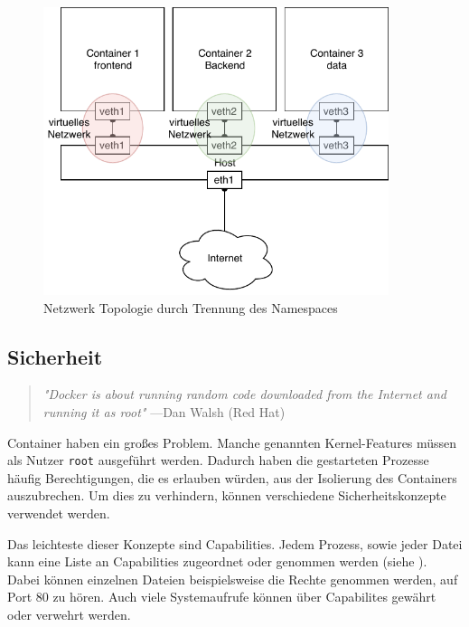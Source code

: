 \begin{figure}[h]
	\begin{center}
		\includegraphics[width=0.9\textwidth]{bilder/network-topology.pdf}
		\caption{Netzwerk Topologie durch Trennung des Namespaces}
		\label{fig:containerHostNetwork}
	\end{center}
\end{figure} 


\subsection{Sicherheit}
\label{sec:sicherheit}

\begin{quote}
	\textit{"Docker is about running random code downloaded from the Internet and running it as root"}
	\flushright
	\small{---Dan Walsh (Red Hat)}
\end{quote}

Container haben ein großes Problem. Manche genannten Kernel-Features müssen als Nutzer \texttt{root} ausgeführt werden. Dadurch haben die gestarteten Prozesse häufig Berechtigungen, die es erlauben würden, aus der Isolierung des Containers auszubrechen. Um dies zu verhindern, können verschiedene Sicherheitskonzepte verwendet werden.

Das leichteste dieser Konzepte sind Capabilities. Jedem Prozess, sowie jeder Datei kann eine Liste an Capabilities zugeordnet oder genommen werden (siehe ). Dabei können einzelnen Dateien beispielsweise die Rechte genommen werden, auf Port 80 zu hören. Auch viele Systemaufrufe können über Capabilites gewährt oder verwehrt werden.

